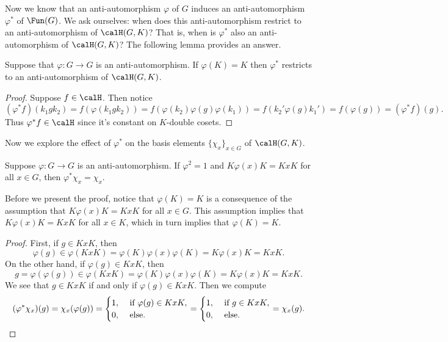Now we know that an anti-automorphism $\varphi$ of $G$ induces an anti-automorphism $\varphi^\ast$ of $\Fun(G)$.
We ask ourselves: when does this anti-automorphism restrict to an anti-automorphism of $\calH(G,K)$?
That is, when is $\varphi^\ast$ also an anti-automorphism of $\calH(G,K)$? The following lemma provides an answer.
\begin{lem}
    Suppose that $\varphi\colon G\to G$ is an anti-automorphism.
    If $\varphi(K)=K$ then $\varphi^\ast$ restricts to an anti-automorphism of $\calH(G,K)$.
\end{lem}
\begin{proof}
    Suppose $f\in\calH$.
    Then notice
    \[
        (\varphi^\ast f)(k_1gk_2) = f(\varphi(k_1gk_2)) = f(\varphi(k_2)\varphi(g)\varphi(k_1)) = f(k_2'\varphi(g)k_1') = f(\varphi(g)) = (\varphi^\ast f)(g).
    \]
    Thus $\varphi^\ast f \in\calH$ since it's constant on $K$-double cosets.
\end{proof}
Now we explore the effect of $\varphi^\ast$ on the basis elements $\{\chi_x\}_{x\in G}$ of $\calH(G,K)$.
\begin{lem}\label{lem: id_on_basis}
    Suppose $\varphi\colon G\to G$ is an anti-automorphism.
    If $\varphi^2=1$ and $K\varphi(x)K=KxK$ for all $x\in G$, then $\varphi^\ast\chi_x=\chi_x$.
\end{lem}
Before we present the proof, notice that $\varphi(K)=K$ is a consequence of the assumption that $K\varphi(x)K=KxK$ for all $x\in G$.
This assumption implies that $K\varphi(x)K=KxK$ for all $x\in K$, which in turn implies that $\varphi(K)=K$.
\begin{proof}
    First, if $g\in KxK$, then
    \[
        \varphi(g)\in \varphi(KxK) = \varphi(K)\varphi(x)\varphi(K) = K\varphi(x)K = KxK.
    \]
    On the other hand, if $\varphi(g)\in KxK$, then
    \[
        g = \varphi(\varphi(g)) \in \varphi(KxK) = \varphi(K)\varphi(x)\varphi(K) = K\varphi(x)K = KxK.
    \]
    We see that $g\in KxK$ if and only if $\varphi(g)\in KxK$.
    Then we compute
    \[
        (\varphi^\ast\chi_x)(g) = \chi_x(\varphi(g)) = \begin{cases}
            1,\  & \text{if}\ \varphi(g)\in KxK, \\
            0,\  & \text{else}.
        \end{cases} = \begin{cases}
            1,\  & \text{if}\ g\in KxK, \\
            0,\  & \text{else}.
        \end{cases} = \chi_x(g).\qedhere
    \]
\end{proof}
